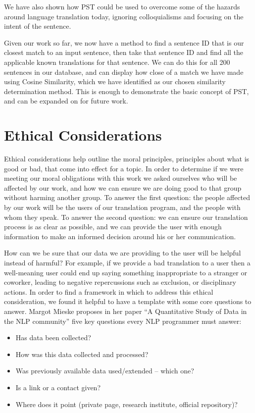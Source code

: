 \documentclass[runningheads]{llncs}
\begin{document}
	We have also shown how PST could be used to overcome some of the hazards around language translation today, ignoring colloquialisms and focusing on the intent of the sentence.

	Given our work so far, we now have a method to find a sentence ID that is our closest match to an input sentence, then take that sentence ID and find all the applicable known translations for that sentence. We can do this for all 200 sentences in our database, and can display how close of a match we have made using Cosine Similarity, which we have identified as our chosen similarity determination method. This is enough to demonstrate the basic concept of PST, and can be expanded on for future work.

	\section{Ethical Considerations}
	Ethical considerations help outline the moral principles, principles about what is good or bad, that come into effect for a topic. In order to determine if we were meeting our moral obligations with this work we asked ourselves who will be affected by our work, and how we can ensure we are doing good to that group without harming another group. To answer the first question: the people affected by our work will be the users of our translation program, and the people with whom they speak. To answer the second question: we can ensure our translation process is as clear as possible, and we can provide the user with enough information to make an informed decision around his or her communication. 

	How can we be sure that our data we are providing to the user will be helpful instead of harmful? For example, if we provide a bad translation to a user then a well-meaning user could end up saying something inappropriate to a stranger or coworker, leading to negative repercussions such as exclusion, or disciplinary actions. In order to find a framework in which to address this ethical consideration, we found it helpful to have a template with some core questions to answer. Margot Mieske proposes in her paper ``A Quantitative Study of Data in the NLP community'' five key questions every NLP programmer must answer: ~\cite{ref_url8}


	\begin{table} 
		\begin{center}
			\begin{itemize}
				\item Has data been collected? 
				\item How was this data collected and processed? 
			 	\item Was previously available data used/extended – which one? 
				\item Is a link or a contact given? 
				\item Where does it point (private page, research institute, official repository)?
			\end{itemize}
		\end{center}
		\label{List: Ethical Questions}
	\end{table}
\end{document}
